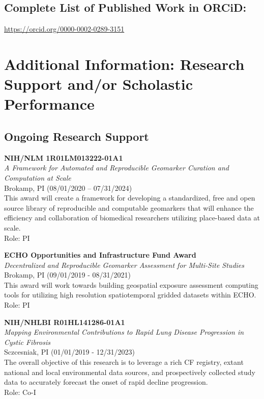 \documentclass{nihbiosketch}
\begin{document}
\subsection*{Complete List of Published Work in ORCiD:} 
\url{https://orcid.org/0000-0002-0289-3151}

\section{Additional Information: Research Support and/or Scholastic Performance}

\subsection*{Ongoing Research Support}

\bigskip

\textbf{NIH/NLM 1R01LM013222-01A1}\\
\emph{A Framework for Automated and Reproducible Geomarker Curation and Computation at Scale}\\
Brokamp, PI (08/01/2020 – 07/31/2024)\\
This award will create a framework for developing a standardized, free and open source library of reproducible and computable geomarkers that will enhance the efficiency and collaboration of biomedical researchers utilizing place-based data at scale.\\
Role: PI

\bigskip

\textbf{ECHO Opportunities and Infrastructure Fund Award}\\
\emph{Decentralized and Reproducible Geomarker Assessment for Multi-Site
  Studies}\\
Brokamp, PI (09/01/2019 - 08/31/2021)\\
This award will work towards building geospatial exposure assessment
computing tools for utilizing high resolution spatiotemporal gridded
datasets within ECHO.\\
Role: PI

\bigskip

\textbf{NIH/NHLBI R01HL141286-01A1}\\
\emph{Mapping Environmental Contributions to Rapid Lung Disease
Progression in Cystic Fibrosis}\\
Sczcesniak, PI (01/01/2019 - 12/31/2023)\\
The overall objective of this research is to leverage a rich CF
registry, extant national and local environmental data sources, and
prospectively collected study data to accurately forecast the onset of
rapid decline progression.\\
Role: Co-I
\end{document}
